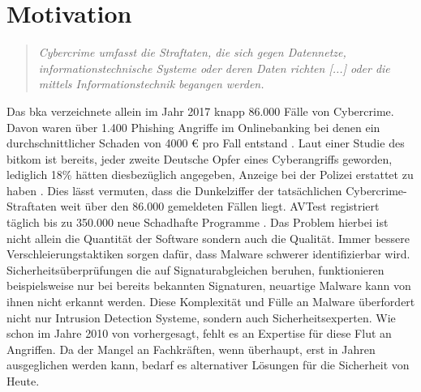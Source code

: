 \documentclass[
    12pt, %
    DIV10,
    ngerman, %
    a4paper, %
    oneside, %
    titlepage, %
    parskip=half, %
    headings=normal, %
    listof=totoc, %
    bibliography=totoc, %
    index=totoc, %
    captions=tableheading, %
    final %
]{scrreprt}
\begin{document}
\section{Motivation}
\begin{quote}
\textsl{Cybercrime umfasst die Straftaten, die sich gegen Datennetze, informationstechnische Systeme
oder deren Daten richten [...] oder die mittels Informationstechnik
begangen werden. \parencite{Cybercrime2017}}
\end{quote}
Das \ac{bka} verzeichnete allein im Jahr 2017 knapp 86.000 Fälle von Cybercrime. Davon waren über 1.400 Phishing Angriffe im Onlinebanking bei denen ein durchschnittlicher Schaden von 4000 € pro Fall entstand \parencite{Cybercrime2017}. Laut einer Studie des \ac{bitkom} ist bereits, jeder zweite Deutsche Opfer eines Cyberangriffs geworden, lediglich 18\% hätten diesbezüglich angegeben, Anzeige bei der Polizei erstattet zu haben \parencite{Bitkome.V.2017}. Dies lässt vermuten, dass die Dunkelziffer der tatsächlichen Cybercrime-Straftaten weit über den 86.000 gemeldeten Fällen liegt. AVTest registriert täglich bis zu 350.000 neue Schadhafte Programme \parencite{AV-TEST2019}. Das Problem hierbei ist nicht allein die Quantität der Software sondern auch die Qualität. Immer bessere Verschleierungstaktiken sorgen dafür, dass Malware schwerer identifizierbar wird. Sicherheitsüberprüfungen die auf Signaturabgleichen beruhen, funktionieren beispielsweise nur bei bereits bekannten Signaturen, neuartige Malware kann von ihnen nicht erkannt werden. Diese Komplexität und Fülle an Malware überfordert nicht nur Intrusion Detection Systeme, sondern auch Sicherheitsexperten. Wie schon im Jahre 2010 von \textcite{Evans2010} vorhergesagt, fehlt es an Expertise für diese Flut an Angriffen. Da der Mangel an Fachkräften, wenn überhaupt, erst in Jahren ausgeglichen werden kann, bedarf es alternativer Lösungen für die Sicherheit von Heute.
\\\\ 
\end{document}
